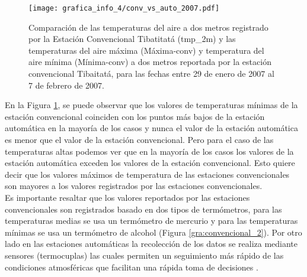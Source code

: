  \begin{figure}[H]
	\begin{center}
	\texttt{[image: grafica\_info\_4/conv\_vs\_auto\_2007.pdf]}
		\caption{Comparación de las temperaturas del aire a dos metros registrado por la Estación Convencional Tibatitatá (tmp\_2m) y las temperaturas del aire máxima (Máxima-conv) y temperatura del aire mínima (Mínima-conv) a dos metros reportada por la estación convencional Tibaitatá, para las fechas entre 29 de enero de 2007 al 7 de febrero de 2007.}
		\label{subfig:b1}
	\end{center}
\end{figure}

 En la Figura \ref{subfig:b1}, se puede observar que los valores de temperaturas mínimas de la estación convencional coinciden con los puntos más bajos de la estación automática en la mayoría de los casos y nunca el valor de la estación automática es menor que el valor de la estación convencional. Pero para el caso de las temperaturas altas podemos ver que en la mayoría de los casos los valores de la estación automática exceden los valores de la estación convencional. Esto quiere decir que los valores máximos de temperatura de las estaciones convencionales son mayores a los valores registrados por las estaciones convencionales.\\
 
 Es importante resaltar que los valores reportados por las estaciones convencionales son registrados basado en dos tipos de termómetros, para las temperaturas medias se usa un termómetro de mercurio y para las temperaturas mínimas se usa un termómetro de alcohol \citep{augter2013vergleich} (Figura \ref{gra:convencional_2}). Por otro lado en las estaciones automáticas la recolección de los datos se realiza mediante sensores (termocuplas) las cuales permiten un seguimiento más rápido de las condiciones atmosféricas que facilitan una rápida toma de decisiones \citep{Soares2017}.
 
%




